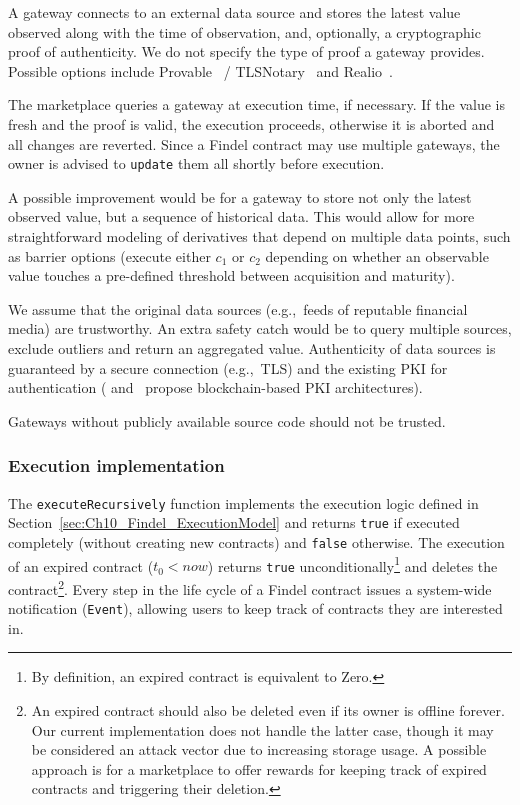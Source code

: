A gateway connects to an external data source and stores the latest value observed along with the time of observation, and, optionally, a cryptographic proof of authenticity.
We do not specify the type of proof a gateway provides.
Possible options include Provable~\cite{Provable} / TLSNotary~\cite{TLSNotary} and Realio~\cite{Realitio}.

The marketplace queries a gateway at execution time, if necessary. 
If the value is fresh and the proof is valid, the execution proceeds, otherwise it is aborted and all changes are reverted.
Since a Findel contract may use multiple gateways, the owner is advised to \texttt{update} them all shortly before execution.

A possible improvement would be for a gateway to store not only the latest observed value, but a sequence of historical data.
This would allow for more straightforward modeling of derivatives that depend on multiple data points, such as barrier options (execute either \(c_1\) or \(c_2\) depending on whether an observable value touches a pre-defined threshold between acquisition and maturity).

We assume that the original data sources (e.g.,~feeds of reputable financial media) are trustworthy.
An extra safety catch would be to query multiple sources, exclude outliers and return an aggregated value.
Authenticity of data sources is guaranteed by a secure connection (e.g.,~TLS) and the existing PKI for authentication (\cite{Fromknecht2014} and~\cite{Lewison2016} propose blockchain-based PKI architectures).

Gateways without publicly available source code should not be trusted.


\subsubsection{Execution implementation} \label{sec:Ch10_Findel_ExecutionImplementation}

The \texttt{executeRecursively} function implements the execution logic defined in Section~\ref{sec:Ch10_Findel_ExecutionModel} and returns \texttt{true} if executed completely (without creating new contracts) and \texttt{false} otherwise.
The execution of an expired contract ($t_0 < now$) returns \texttt{true} unconditionally\footnote{By definition, an expired contract is equivalent to \(\mathrm{Zero}\).} and deletes the contract\footnote{An expired contract should also be deleted even if its owner is offline forever. Our current implementation does not handle the latter case, though it may be considered an attack vector due to increasing storage usage. A possible approach is for a marketplace to offer rewards for keeping track of expired contracts and triggering their deletion.}.
Every step in the life cycle of a Findel contract issues a system-wide notification (\texttt{Event}), allowing users to keep track of contracts they are interested in.

